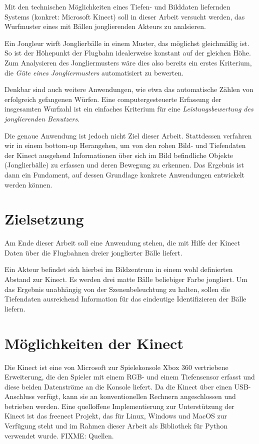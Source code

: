 \documentclass[12pt,a4paper,ngerman]{scrartcl}
\begin{document}
Mit den technischen Möglichkeiten eines Tiefen- und Bilddaten liefernden Systems 
(konkret: Microsoft Kinect) soll in dieser Arbeit versucht werden, das Wurfmuster
eines mit Bällen jonglierenden Akteurs zu analsieren.

Ein Jongleur wirft Jonglierbälle in einem Muster, das möglichst gleichmäßig ist.
So ist der Höhepunkt der Flugbahn idealerweise konstant auf der gleichen Höhe.
Zum Analysieren des Jongliermusters wäre dies also bereits ein erstes Kriterium, 
die \textit{Güte eines Jongliermusters} automatisiert zu bewerten.

Denkbar sind auch weitere Anwendungen, wie etwa das automatische Zählen von 
erfolgreich gefangenen Würfen. Eine computergesteuerte Erfassung der insgesamten
Wurfzahl ist ein einfaches Kriterium für eine \textit{Leistungsbewertung des 
jonglierenden Benutzers}.

Die genaue Anwendung ist jedoch nicht Ziel dieser Arbeit. Stattdessen verfahren wir
in einem bottom-up Herangehen, um von den rohen Bild- und Tiefendaten der Kinect 
ausgehend Informationen über sich im Bild befindliche Objekte (Jonglierbälle) zu
erfassen und deren Bewegung zu erkennen. Das Ergebnis ist dann ein Fundament, auf
dessen Grundlage konkrete Anwendungen entwickelt werden können.

\section{Zielsetzung}

Am Ende dieser Arbeit soll eine Anwendung stehen, die mit Hilfe der Kinect Daten 
über die Flugbahnen dreier jonglierter Bälle liefert. 

Ein Akteur befindet sich hierbei im Bildzentrum in einem wohl definierten Abstand 
zur Kinect. Es werden drei matte Bälle beliebiger Farbe jongliert. Um das Ergebnis
unabhängig von der Szenenbeleuchtung zu halten, sollen die Tiefendaten ausreichend
Information für das eindeutige Identifizieren der Bälle liefern.

\section{Möglichkeiten der Kinect}

Die Kinect ist eine von Microsoft zur Spielekonsole Xbox 360 vertriebene Erweiterung,
die den Spieler mit einem RGB- und einem Tiefensensor erfasst und diese beiden 
Datenströme an die Konsole liefert. Da die Kinect über einen USB-Anschluss verfügt,
kann sie an konventionellen Rechnern angeschlossen und betrieben werden. Eine 
quelloffene Implementierung zur Unterstützung der Kinect ist das freenect Projekt,
das für Linux, Windows und MacOS zur Verfügung steht und im Rahmen dieser Arbeit
als Bibliothek für Python verwendet wurde. FIXME: Quellen.
\end{document}
